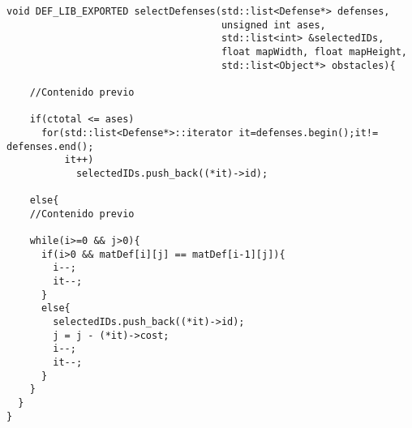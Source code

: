 \begin{lstlisting}
void DEF_LIB_EXPORTED selectDefenses(std::list<Defense*> defenses,
                                     unsigned int ases,
                                     std::list<int> &selectedIDs,
                                     float mapWidth, float mapHeight,
                                     std::list<Object*> obstacles){

    //Contenido previo

    if(ctotal <= ases)
      for(std::list<Defense*>::iterator it=defenses.begin();it!= defenses.end();
          it++)
            selectedIDs.push_back((*it)->id);

    else{
    //Contenido previo

    while(i>=0 && j>0){
      if(i>0 && matDef[i][j] == matDef[i-1][j]){
        i--;
        it--;
      }
      else{
        selectedIDs.push_back((*it)->id);
        j = j - (*it)->cost;
        i--;
        it--;
      }
    }
  }
}
\end{lstlisting}
